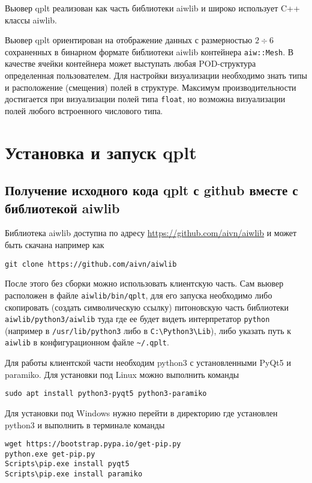 \documentclass[12pt]{article}
\begin{document}
Вьювер qplt реализован как часть библиотеки aiwlib и широко использует C++ классы aiwlib.

Вьювер qplt ориентирован на отображение данных с размерностью $2\div6$ сохраненных в бинарном формате библиотеки aiwlib контейнера \verb'aiw::Mesh'.
В качестве ячейки контейнера может выступать любая POD-структура определенная пользователем.
Для настройки визуализации необходимо знать типы и расположение (смещения) полей в структуре.
Максимум производительности достигается при визуализации полей типа \verb'float', но возможна визуализации полей
любого встроенного числового типа.

\section{Установка и запуск qplt}
\subsection{Получение исходного кода qplt с github вместе с библиотекой aiwlib}
Библиотека aiwlib доступна по адресу \href{https://github.com/aivn/aiwlib}{https://github.com/aivn/aiwlib}
и может быть скачана например как
\begin{verbatim}
git clone https://github.com/aivn/aiwlib
\end{verbatim}
После этого без сборки можно использовать клиентскую часть. Сам вьювер расположен в файле \verb'aiwlib/bin/qplt',
для его запуска необходимо либо скопировать (создать символическую ссылку) питоновскую часть библиотеки \verb'aiwlib/python3/aiwlib'
туда где ее будет видеть интерпретатор \verb'python' (например в \verb'/usr/lib/python3' либо в \verb'C:\Python3\Lib'),
либо указать путь к \verb'aiwlib' в конфигурационном файле \verb'~/.qplt'.

Для работы клиентской части необходим python3 с установленными PyQt5 и paramiko. Для установки под Linux можно выполнить команды
\begin{verbatim}
sudo apt install python3-pyqt5 python3-paramiko
\end{verbatim}
Для установки под Windows нужно перейти в директорию где установлен python3 и выполнить в терминале команды
\begin{verbatim}
wget https://bootstrap.pypa.io/get-pip.py 
python.exe get-pip.py
Scripts\pip.exe install pyqt5
Scripts\pip.exe install paramiko
\end{verbatim}
\end{document}
